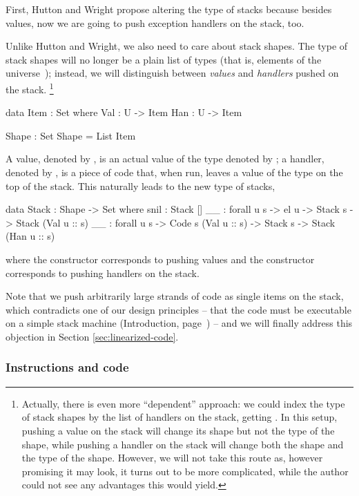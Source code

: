 First, Hutton and Wright propose altering the type of stacks because besides
values, now we are going to push exception handlers on the stack, too.

Unlike Hutton and Wright, we also need to care about stack shapes.  The type of
stack shapes will no longer be a plain list of types (that is, elements of the
universe~); instead, we  will distinguish between \emph{values} and
\emph{handlers} pushed on the stack.  \footnote{Actually, there is even more
	``dependent'' approach: we could index the type of stack shapes by the
	list of handlers on the stack, getting . In this setup, pushing a value on the stack will change its shape
	but not the type of the shape, while pushing a handler on the stack
	will change both the shape and the type of the shape. However, we will
	not take this route as, however promising it may look, it turns out to
	be more complicated, while the author could not see any advantages this
would yield.}

\begin{code}
  data Item : Set where
    Val : U -> Item
    Han : U -> Item

  Shape : Set
  Shape = List Item
\end{code}
A value, denoted by , is an actual value of the type
denoted by ; a handler, denoted by , is a piece of code
that, when run, leaves a value of the type  on the top of the stack.
This naturally leads to the new type of stacks,
\label{sec:gmh-ham-stack}\begin{code}
  data Stack : Shape -> Set where
    snil : Stack []
    _\scons\_ : forall {u s} -> el u -> Stack s -> Stack (Val u :: s)
    _\sconsh\_ : forall {u s} -> Code s (Val u :: s) -> Stack s -> Stack (Han u :: s)
\end{code}
where the constructor \ident{\scons\!\!} corresponds to pushing values and the
constructor \ident{\sconsh\!\!} corresponds to pushing handlers on the stack.

Note that we push arbitrarily large strands of code as single items on the stack,
which contradicts one of our design principles -- that the
code must be executable on a simple stack machine (Introduction, page~\pageref{objectives})
-- and we will finally address this objection in Section \ref{sec:linearized-code}.

\subsubsection{Instructions and code}

